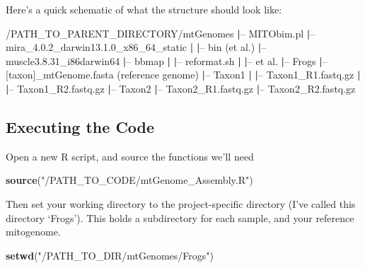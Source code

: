 \documentclass[
]{article}
\newenvironment{Shaded}{\begin{snugshade}}{\end{snugshade}}
\newcommand{\ExtensionTok}[1]{#1}
\newcommand{\KeywordTok}[1]{\textcolor[rgb]{0.13,0.29,0.53}{\textbf{#1}}}
\newcommand{\NormalTok}[1]{#1}
\newcommand{\StringTok}[1]{\textcolor[rgb]{0.31,0.60,0.02}{#1}}
\begin{document}
Here's a quick schematic of what the structure should look like:

\begin{Shaded}
\begin{Highlighting}[]
\ExtensionTok{/PATH_TO_PARENT_DIRECTORY/mtGenomes}
\KeywordTok{|}\ExtensionTok{--}\NormalTok{ MITObim.pl}
\KeywordTok{|}\ExtensionTok{--}\NormalTok{ mira_4.0.2_darwin13.1.0_x86_64_static}
\KeywordTok{|}   \KeywordTok{|}\ExtensionTok{--}\NormalTok{ bin (et al.)}
\KeywordTok{|}\ExtensionTok{--}\NormalTok{ muscle3.8.31_i86darwin64}
\KeywordTok{|}\ExtensionTok{--}\NormalTok{ bbmap}
\KeywordTok{|}   \KeywordTok{|}\ExtensionTok{--}\NormalTok{ reformat.sh}
\KeywordTok{|}   \KeywordTok{|}\ExtensionTok{--}\NormalTok{ et al.}
\KeywordTok{|}\ExtensionTok{--}\NormalTok{ Frogs}
    \KeywordTok{|}\ExtensionTok{--}\NormalTok{ [taxon]_mtGenome.fasta (reference genome)}
    \KeywordTok{|}\ExtensionTok{--}\NormalTok{ Taxon1}
    \KeywordTok{|}   \KeywordTok{|}\ExtensionTok{--}\NormalTok{ Taxon1_R1.fastq.gz}
    \KeywordTok{|}   \KeywordTok{|}\ExtensionTok{--}\NormalTok{ Taxon1_R2.fastq.gz}
    \KeywordTok{|}\ExtensionTok{--}\NormalTok{ Taxon2}
        \KeywordTok{|}\ExtensionTok{--}\NormalTok{ Taxon2_R1.fastq.gz}
        \KeywordTok{|}\ExtensionTok{--}\NormalTok{ Taxon2_R2.fastq.gz}
\end{Highlighting}
\end{Shaded}

\pagebreak

\hypertarget{executing-the-code}{%
\subsection{Executing the Code}\label{executing-the-code}}

Open a new R script, and source the functions we'll need

\begin{Shaded}
\begin{Highlighting}[]
\KeywordTok{source}\NormalTok{(}\StringTok{"/PATH_TO_CODE/mtGenome_Assembly.R"}\NormalTok{)}
\end{Highlighting}
\end{Shaded}

Then set your working directory to the project-specific directory (I've
called this directory `Frogs'). This holds a subdirectory for each
sample, and your reference mitogenome.

\begin{Shaded}
\begin{Highlighting}[]
\KeywordTok{setwd}\NormalTok{(}\StringTok{"/PATH_TO_DIR/mtGenomes/Frogs"}\NormalTok{)}
\end{Highlighting}
\end{Shaded}
\end{document}
